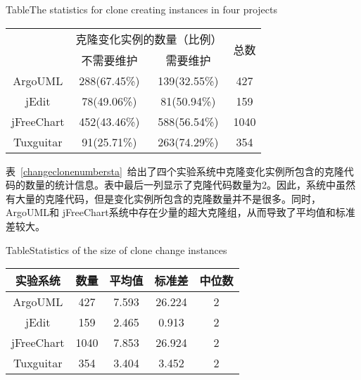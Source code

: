 \begin{table}[htbp]
{Table$\!$}{The statistics for clone creating instances in four projects}
\vspace{0.5em}
\centering
\wuhao
\begin{tabular}{cccc}
\toprule[1.5pt]
~\multirow{2}{*}{实验系统}& \multicolumn{2}{c}{克隆变化实例的数量（比例）} & \multirow{2}{*}{总数}\\ 
 \cline{2-3}
~&{不需要维护} &{需要维护} & ~\\
\midrule[1pt]
ArgoUML&288(67.45\%)&139(32.55\%)&427\\
jEdit&78(49.06\%)&81(50.94\%)&159\\
jFreeChart&452(43.46\%)&588(56.54\%)&1040\\
Tuxguitar&91(25.71\%)&263(74.29\%)&354\\
\bottomrule[1.5pt]
\end{tabular}
\end{table}

表~\ref{changeclonenumbersta}~给出了四个实验系统中克隆变化实例所包含的克隆代码的数量的统计信息。表中最后一列显示了克隆代码数量为2。因此，系统中虽然有大量的克隆代码，但是变化实例所包含的克隆数量并不是很多。同时，ArgoUML和 jFreeChart系统中存在少量的超大克隆组，从而导致了平均值和标准差较大。

\begin{table}[htbp]
{Table$\!$}{Statistics of the size of clone change instances}
\vspace{0.5em}
\centering
\wuhao
\begin{tabular}{ccccc}
\toprule[1.5pt]
{实验系统}&{数量}&{平均值}&{标准差}&{中位数}\\ 
\midrule[1pt]
ArgoUML&427&7.593&	26.224&2\\
jEdit&159&	2.465&	0.913&2\\ 
jFreeChart&1040&	7.853&	26.924&2\\
Tuxguitar&354&	3.404	&3.452&2\\ 
\bottomrule[1.5pt]
\end{tabular}
\end{table}


